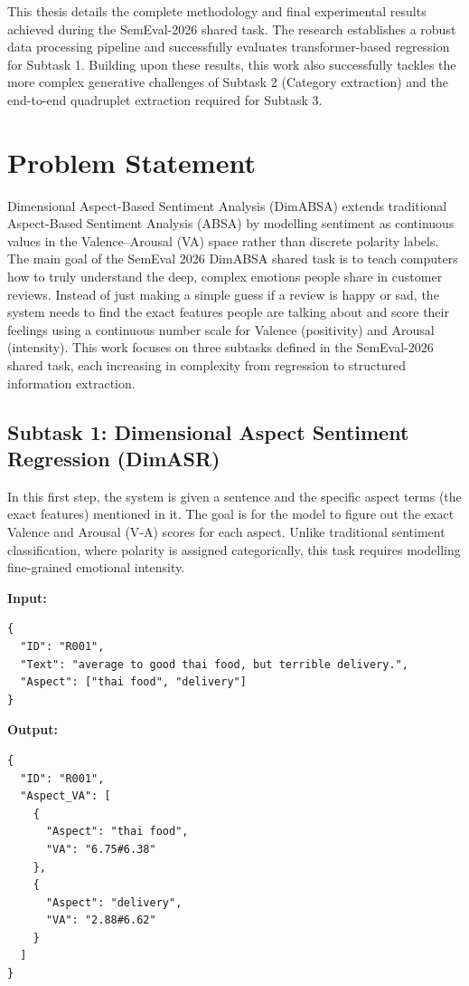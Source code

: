 \documentclass{article}
\begin{document}
This thesis details the complete methodology and final experimental results achieved during the SemEval-2026 shared task. The research establishes a robust data processing pipeline and successfully evaluates transformer-based regression for Subtask 1. Building upon these results, this work also successfully tackles the more complex generative challenges of Subtask 2 (Category extraction) and the end-to-end quadruplet extraction required for Subtask 3.

\section{Problem Statement}
\label{sec:problem}

Dimensional Aspect-Based Sentiment Analysis (DimABSA) extends traditional Aspect-Based Sentiment Analysis (ABSA) by modelling sentiment as continuous values in the Valence–Arousal (VA) space rather than discrete polarity labels. The main goal of the SemEval 2026 DimABSA shared task is to teach computers how to truly understand the deep, complex emotions people share in customer reviews. Instead of just making a simple guess if a review is happy or sad, the system needs to find the exact features people are talking about and score their feelings using a continuous number scale for Valence (positivity) and Arousal (intensity). This work focuses on three subtasks defined in the SemEval-2026 shared task, each increasing in complexity from regression to structured information extraction.

\subsection{Subtask 1: Dimensional Aspect Sentiment Regression (DimASR)}

In this first step, the system is given a sentence and the specific aspect terms (the exact features) mentioned in it. The goal is for the model to figure out the exact Valence and Arousal (V-A) scores for each aspect. Unlike traditional sentiment classification, where polarity is assigned categorically, this task requires modelling fine-grained emotional intensity.

\textbf{Input:}
\begin{verbatim}
{
  "ID": "R001",
  "Text": "average to good thai food, but terrible delivery.",
  "Aspect": ["thai food", "delivery"]
}
\end{verbatim}

\textbf{Output:}
\begin{verbatim}
{
  "ID": "R001",
  "Aspect_VA": [
    {
      "Aspect": "thai food",
      "VA": "6.75#6.38"
    },
    {
      "Aspect": "delivery",
      "VA": "2.88#6.62"
    }
  ]
}
\end{verbatim}
\end{document}
